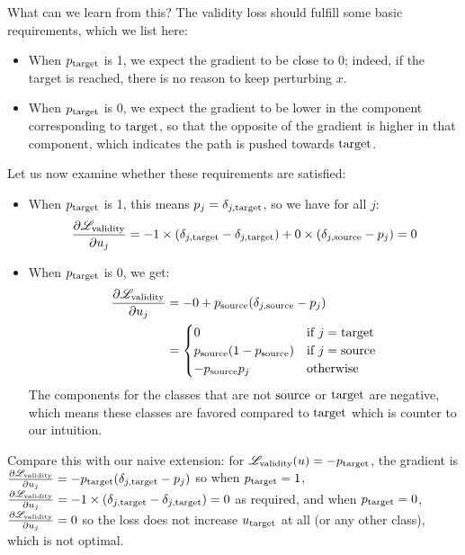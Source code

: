 \documentclass[../main.tex]{subfiles}
\begin{document}
What can we learn from this?
The validity loss should fulfill some basic requirements, which we list here:
\begin{itemize}
    \item When $p_{\mathrm{target}}$ is 1, we expect the gradient to be close to 0; indeed, if the target is reached, there is no reason to keep perturbing $x$.
    \item When $p_{\mathrm{target}}$ is 0, we expect the gradient to be lower in the component corresponding to $\mathrm{target}$, so that the opposite of the gradient is higher in that component, which indicates the path is pushed towards $\mathrm{target}$.
\end{itemize}

Let us now examine whether these requirements are satisfied:
\begin{itemize}
    \item When $p_{\mathrm{target}}$ is 1, this means $p_j = \delta_{j, \mathrm{target}}$, so we have for all $j$:
          \begin{equation*}
              \frac{\partial \mathscr{L}_\text{validity}}{\partial u_j} = -1 \times (\delta_{j, \mathrm{target}} -\delta_{j, \mathrm{target}}) + 0 \times (\delta_{j, \mathrm{source}} - p_j) = 0
          \end{equation*}
    \item When $p_{\mathrm{target}}$ is 0, we get:
          \begin{align*}
              \frac{\partial \mathscr{L}_\text{validity}}{\partial u_j}
               & = -0 + p_{\mathrm{source}} (\delta_{j, \mathrm{source}} - p_j)                        \\
               & = \begin{cases}
                       0                         & \text{if } j = \mathrm{target} \\
                       p_{\mathrm{source}} (1 - p_{\mathrm{source}}) & \text{if } j = \mathrm{source} \\
                       - p_{\mathrm{source}} p_j           & \text{otherwise}
                   \end{cases}
          \end{align*}
          The components for the classes that are not $\mathrm{source}$ or $\mathrm{target}$ are negative, which means these classes are favored compared to $\mathrm{target}$ which is counter to our intuition.
\end{itemize}
Compare this with our naive extension:
for $\mathscr{L}_\text{validity}(u) = -p_{\mathrm{target}}$, the gradient is
$\frac{\partial \mathscr{L}_\text{validity}}{\partial u_j} =  -  p_{\mathrm{target}} (\delta_{j, \mathrm{target}} - p_j)$
so when
$p_{\mathrm{target}} = 1$, $\frac{\partial \mathscr{L}_\text{validity}}{\partial u_j} = -1 \times (\delta_{j, \mathrm{target}} - \delta_{j, \mathrm{target}}) = 0$ as required,
and when
$p_{\mathrm{target}} = 0$, $\frac{\partial \mathscr{L}_\text{validity}}{\partial u_j} = 0$ so the loss does not increase $u_{\mathrm{target}}$ at all (or any other class), which is not optimal.
\end{document}
